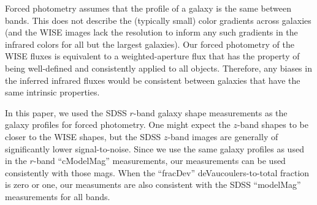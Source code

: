 \documentclass[12pt,preprint]{aastex}
\begin{document}
Forced photometry assumes that the profile of a galaxy is the same
between bands.  This does not describe the (typically small) color
gradients across galaxies (and the WISE images lack the resolution to
inform any such gradients in the infrared colors for all but the
largest galaxies).  Our forced photometry of the WISE fluxes is
equivalent to a weighted-aperture flux that has the property of being
well-defined and consistently applied to all objects.  Therefore, any
biases in the inferred infrared fluxes would be consistent between
galaxies that have the same intrinsic properties.


In this paper, we used the SDSS $r$-band galaxy shape measurements as
the galaxy profiles for forced photometry.  One might expect the
$z$-band shapes to be closer to the WISE shapes, but the SDSS $z$-band
images are generally of significantly lower signal-to-noise.  Since we
use the same galaxy profiles as used in the $r$-band ``cModelMag''
measurements, our measurements can be used consistently with those
mags.  When the ``fracDev'' deVaucoulers-to-total fraction is zero or
one, our measuments are also consistent with the SDSS ``modelMag''
measurements for all bands.



%
%
%
% 
% 
\end{document}
